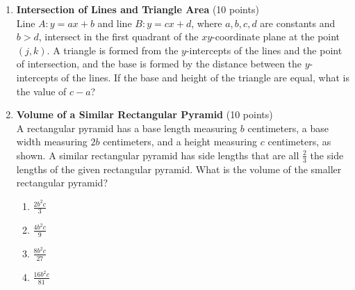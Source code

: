 \begin{enumerate}
  \item \textbf{Intersection of Lines and Triangle Area} (10 points)\\
  Line $A: y=ax+b$ and line $B: y=cx+d$, where $a, b, c, d$ are constants and $b>d$, intersect in the first quadrant of the $xy$-coordinate plane at the point $(j, k)$. A triangle is formed from the $y$-intercepts of the lines and the point of intersection, and the base is formed by the distance between the $y$-intercepts of the lines. If the base and height of the triangle are equal, what is the value of $c-a$?
  \begin{subanswer}
  \end{subanswer}





  \newpage





  \item \textbf{Volume of a Similar Rectangular Pyramid} (10 points)\\
  A rectangular pyramid has a base length measuring $b$ centimeters, a base width measuring $2b$ centimeters, and a height measuring $c$ centimeters, as shown. A similar rectangular pyramid has side lengths that are all $\frac{2}{3}$ the side lengths of the given rectangular pyramid. What is the volume of the smaller rectangular pyramid?
  \begin{enumerate}[label=(\Alph*)]
    \item $\frac{2b^2c}{3}$
    \item $\frac{4b^2c}{9}$
    \item $\frac{8b^2c}{27}$
    \item $\frac{16b^2c}{81}$
  \end{enumerate}
  \begin{subanswer}
  \end{subanswer}

  




\end{enumerate}
